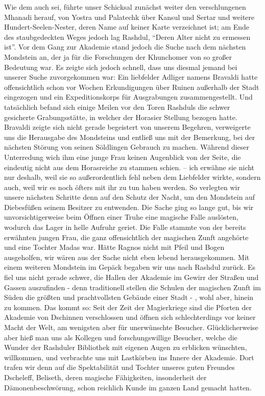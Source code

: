 Wie dem auch sei, führte unser Schicksal zunächst weiter den verschlungenen Mhanadi herauf, von Yostra und Palatechk über Kansul und Sertar und weitere Hundert-Seelen-Nester, deren Name auf keiner Karte verzeichnet ist; am Ende des staubgedeckten Weges jedoch lag Rashdul, ``Deren Alter nicht zu ermessen ist''. Vor dem Gang zur Akademie stand jedoch die Suche nach dem nächsten Mondstein an, der ja für die Forschungen der Khunchomer von so großer Bedeutung war. Es zeigte sich jedoch schnell, dass uns diesmal jemand bei unserer Suche zuvorgekommen war: Ein liebfelder Adliger namens Bravaldi hatte offensichtlich schon vor Wochen Erkundigungen über Ruinen außerhalb der Stadt eingezogen und ein Expeditionskorps für Ausgrabungen zusammengestellt. Und tatsächlich befand sich einige Meilen vor den Toren Rashduls die schwer gesicherte Grabungsstätte, in welcher der Horasier Stellung bezogen hatte. Bravaldi zeigte sich nicht gerade begeistert von unserem Begehren, verweigerte uns die Herausgabe des Mondsteins und entließ uns mit der Bemerkung, bei der nächsten Störung von seinen Söldlingen Gebrauch zu machen. Während dieser Unterredung wich ihm eine junge Frau keinen Augenblick von der Seite, die eindeutig nicht aus dem Horasreiche zu stammen schien. -- ich erwähne sie nicht nur deshalb, weil sie so außerordentlich fehl neben dem Liebfelder wirkte, sondern auch, weil wir es noch öfters mit ihr zu tun haben werden. So verlegten wir unsere nächsten Schritte denn auf den Schutz der Nacht, um den Mondstein auf Diebesfüßen seinem Besitzer zu entwenden. Die Sache ging so lange gut, bis wir unvorsichtigerweise beim Öffnen einer Truhe eine magische Falle auslösten, wodurch das Lager in helle Aufruhr geriet. Die Falle stammte von der bereits erwähnten jungen Frau, die ganz offensichtlich der magischen Zunft angehörte und eine Tochter Madas war. Hätte Ragnos nicht mit Pfeil und Bogen ausgeholfen, wir wären aus der Sache nicht eben lebend herausgekommen. Mit einem weiteren Mondstein im Gepäck begaben wir uns nach Rashdul zurück. Es fiel uns nicht gerade schwer, die Hallen der Akademie im Gewirr der Straßen und Gassen auszufinden - denn traditionell stellen die Schulen der magischen Zunft im Süden die größten und prachtvollsten Gebäude einer Stadt - , wohl aber, hinein zu kommen. Das kommt so: Seit der Zeit der Magierkriege sind die Pforten der Akademie von Dschinnen verschlossen und öffnen sich schlechterdings vor keiner Macht der Welt, am wenigsten aber für unerwünschte Besucher. Glücklicherweise aber hieß man uns als Kollegen und forschungswillige Besucher, welche die Wunder der Rashduler Bibliothek mit eigenen Augen zu erblicken wünschten, willkommen, und verbrachte uns mit Lastkörben ins Innere der Akademie. Dort trafen wir denn auf die Spektabilität und Tochter unseres guten Freundes Dscheleff, Beliseth, deren magische Fähigkeiten, insonderheit der Dämonenbeschwörung, schon reichlich Kunde im ganzen Land gemacht hatten.

